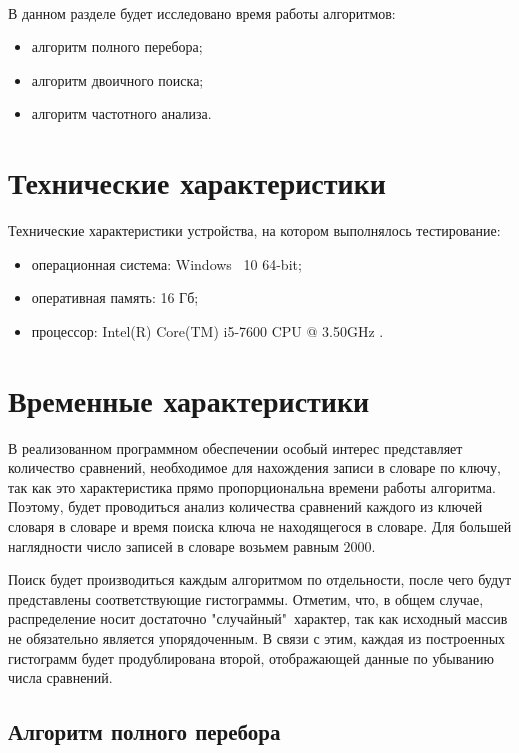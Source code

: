 \documentclass[12pt]{report}
\begin{document}
	\paragraph{}
	В данном разделе будет исследовано время работы алгоритмов:
	\begin{itemize}
		\item алгоритм полного перебора;
		\item алгоритм двоичного поиска;
		\item алгоритм частотного анализа.
	\end{itemize}
	
	\section{Технические характеристики}
	Технические характеристики устройства, на котором выполнялось тестирование:
	\begin{itemize}
		\item операционная система: Windows~\cite{windows} 10 64-bit;
		\item оперативная память: 16 Гб;
		\item процессор: Intel(R) Core(TM) i5-7600 CPU @ 3.50GHz \cite{i5}.
	\end{itemize}
	
	\section{Временные характеристики}
	
	В реализованном программном обеспечении особый интерес представляет количество сравнений, необходимое для нахождения записи в словаре по ключу, так как это характеристика прямо пропорциональна времени работы алгоритма. Поэтому, будет проводиться анализ количества сравнений каждого из ключей словаря в словаре и время поиска ключа не находящегося в словаре. Для большей наглядности число записей в словаре возьмем равным $2000$. 
	
	Поиск будет производиться каждым алгоритмом по отдельности, после чего будут представлены соответствующие гистограммы. Отметим, что, в общем случае, распределение носит достаточно "случайный"\ характер, так как исходный массив не обязательно является упорядоченным. В связи с этим, каждая из построенных гистограмм будет продублирована второй, отображающей данные по убыванию числа сравнений.
	
	\subsection{Алгоритм полного перебора}
	
\end{document}
